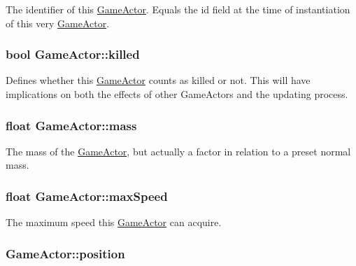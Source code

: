 The identifier of this \hyperlink{class_game_actor}{Game\+Actor}. Equals the id field at the time of instantiation of this very \hyperlink{class_game_actor}{Game\+Actor}. \hypertarget{class_game_actor_a7f8bd5ef8278fda5db77a372d8bb6bb9}{
\subsubsection[{killed}]{\setlength{\rightskip}{0pt plus 5cm}bool Game\+Actor\+::killed\hspace{0.3cm}{\ttfamily [protected]}}}\label{class_game_actor_a7f8bd5ef8278fda5db77a372d8bb6bb9}
Defines whether this \hyperlink{class_game_actor}{Game\+Actor} counts as killed or not. This will have implications on both the effects of other Game\+Actors and the updating process. \hypertarget{class_game_actor_a2111233f4f0216db4d172d5088ebeed4}{
\subsubsection[{mass}]{\setlength{\rightskip}{0pt plus 5cm}float Game\+Actor\+::mass\hspace{0.3cm}{\ttfamily [protected]}}}\label{class_game_actor_a2111233f4f0216db4d172d5088ebeed4}
The mass of the \hyperlink{class_game_actor}{Game\+Actor}, but actually a factor in relation to a preset normal mass. \hypertarget{class_game_actor_a15b6abd006c52b21c569932f8b484eb0}{
\subsubsection[{max\+Speed}]{\setlength{\rightskip}{0pt plus 5cm}float Game\+Actor\+::max\+Speed\hspace{0.3cm}{\ttfamily [protected]}}}\label{class_game_actor_a15b6abd006c52b21c569932f8b484eb0}
The maximum speed this \hyperlink{class_game_actor}{Game\+Actor} can acquire. \hypertarget{class_game_actor_aefed3c91bf32ad388d86657b3bb9ddfa}{
\subsubsection[{position}]{ Game\+Actor\+::position\hspace{0.3cm}{\ttfamily [protected]}}}\label{class_game_actor_aefed3c91bf32ad388d86657b3bb9ddfa}
